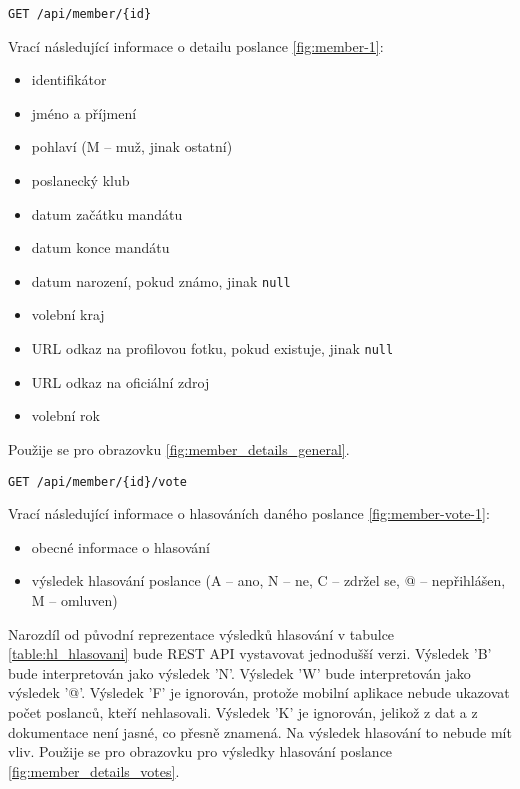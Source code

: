 \begin{lstlisting}[caption={HTTP dotaz pro detail poslance},label={lst:endpoint-member}] 
GET /api/member/{id}
\end{lstlisting}

\noindent Vrací následující informace o detailu poslance \ref{fig:member-1}:

\begin{itemize}
	\item identifikátor
	\item jméno a příjmení
	\item pohlaví (M -- muž, jinak ostatní)
	\item poslanecký klub
	\item datum začátku mandátu
	\item datum konce mandátu
	\item datum narození, pokud známo, jinak \lstinline|null|
	\item volební kraj
	\item URL odkaz na profilovou fotku, pokud existuje, jinak \lstinline|null|
	\item URL odkaz na oficiální zdroj
	\item volební rok
\end{itemize}

\noindent Použije se pro obrazovku \ref{fig:member_details_general}.

\vspace{10px}

\begin{lstlisting}[caption={HTTP dotaz pro hlasování poslance}, label={lst:endpoint-member-votes}] 
GET /api/member/{id}/vote
\end{lstlisting}

\noindent Vrací následující informace o hlasováních daného poslance \ref{fig:member-vote-1}:

\begin{itemize}
\item obecné informace o hlasování
\item výsledek hlasování poslance (A -- ano, N -- ne, C -- zdržel se, @ -- nepřihlášen, M -- omluven)
\end{itemize}

\noindent Narozdíl od původní reprezentace výsledků hlasování v tabulce \ref{table:hl_hlasovani} bude REST API vystavovat jednodušší verzi. Výsledek 'B' bude interpretován jako výsledek 'N'. Výsledek 'W' bude interpretován jako výsledek '@'. Výsledek 'F' je ignorován, protože mobilní aplikace nebude ukazovat počet poslanců, kteří nehlasovali. Výsledek 'K' je ignorován, jelikož z dat a z dokumentace není jasné, co přesně znamená. Na výsledek hlasování to nebude mít vliv. Použije se pro obrazovku pro výsledky hlasování poslance \ref{fig:member_details_votes}.

